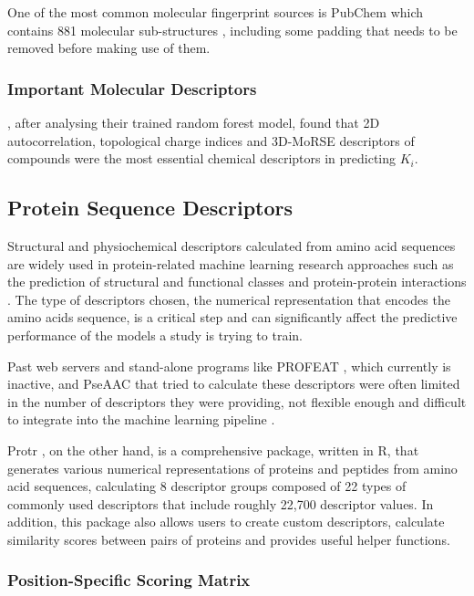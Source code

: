 One of the most common molecular fingerprint sources is PubChem \citep{PubChem} which contains 881 molecular sub-structures \citep{PubChem_Fingerprints}, including some padding that needs to be removed before making use of them. 

\subsubsection{Important Molecular Descriptors}

\citet{Shar2016}, after analysing their trained random forest model, found that 2D autocorrelation, topological charge indices and 3D-MoRSE descriptors of compounds were the most essential chemical descriptors in predicting $K_i$. 

\subsection{Protein Sequence Descriptors}
\label{subsec:Protein_Sequence_Descriptors}

Structural and physiochemical descriptors calculated from amino acid sequences are widely used in protein-related machine learning research approaches such as the prediction of structural and functional classes and protein-protein interactions \citep{ProtR_Paper}. The type of descriptors chosen, the numerical representation that encodes the amino acids sequence, is a critical step and can significantly affect the predictive performance of the models a study is trying to train. 

Past web servers and stand-alone programs like PROFEAT \citep{PROFEAT}, which currently is inactive, and PseAAC \citep{PseAAC} that tried to calculate these descriptors were often limited in the number of descriptors they were providing, not flexible enough and difficult to integrate into the machine learning pipeline \citep{ProtR_Paper}.

Protr \citep{ProtR_Paper}, on the other hand, is a comprehensive package, written in R, that generates various numerical representations of proteins and peptides from amino acid sequences, calculating 8 descriptor groups composed of 22 types of commonly used descriptors that include roughly 22,700 descriptor values. In addition, this package also allows users to create custom descriptors, calculate similarity scores between pairs of proteins and provides useful helper functions.

\subsubsection{Position-Specific Scoring Matrix}
\label{subsubsec:PSSM}

